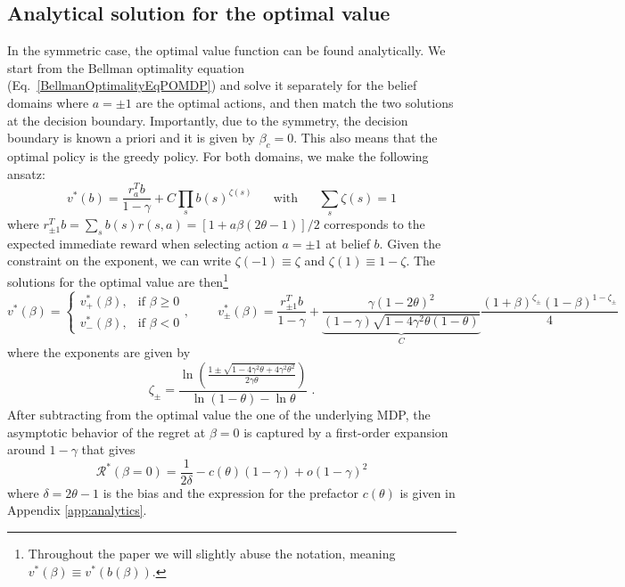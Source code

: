 \documentclass[aps,nofootinbib,groupaddress,superscriptaddress,reprint,amsmath,amssymb,graphicx,onecolumn,prx]{revtex4-2}
\begin{document}
\subsection{Analytical solution for the optimal value}
\noindent In the symmetric case, the optimal value function can be found analytically. We start from the Bellman optimality equation (Eq.~\eqref{BellmanOptimalityEqPOMDP}) and solve it separately for the belief domains where $a = \pm 1$ are the optimal actions, and then match the two solutions at the decision boundary. Importantly, due to the symmetry, the decision boundary is known a priori and it is given by $\beta_c=0$. This also means that the optimal policy is the greedy policy. For both domains, we make the following ansatz:
\begin{equation}
    v^*(b)=\frac{r_{a}^Tb}{1-\gamma}+C\prod_s b(s)^{\zeta(s)} \;\;\;\;\;\;\text{with}\;\;\;\;\;\; \sum_s\zeta(s)=1
    \label{eq:ansatz}
\end{equation}
where $r_{\pm1}^Tb=\sum_sb(s)r(s,a)=[1 + a \beta (2 \theta -1)] / 2$ corresponds to the expected immediate reward when selecting action $a=\pm1$ at belief $b$. Given the constraint on the exponent, we can write $\zeta(-1)\equiv\zeta$ and $\zeta(1)\equiv1-\zeta$.
The solutions for the optimal value are then\footnote{Throughout the paper we will slightly abuse the notation, meaning $v^*(\beta)\equiv v^*(b(\beta))$.}
\begin{equation}
    v^*(\beta)=
    \begin{cases}
        v^*_+(\beta), & \text{if } \beta \geq 0 \\
        v^*_-(\beta), & \text{if } \beta < 0
    \end{cases}, \; \; \; \; \; \; \; \;
    v^*_\pm(\beta)=\frac{r_{\pm1}^Tb}{1-\gamma}+\underbrace{\frac{\gamma (1 - 2\theta)^2}{(1 - \gamma) \sqrt{1 - 4\gamma^2\theta(1 - \theta)}}}_{C} \frac{(1+\beta)^{\zeta_\pm} (1-\beta)^{1 - \zeta_\pm}}{4}
\end{equation}
where the exponents are given by %
\begin{equation}
    \zeta_{\pm}=\frac{\ln \left( \frac{1 \pm \sqrt{1 - 4\gamma^2\theta + 4\gamma^2\theta^2}}{2\gamma\theta} \right)}
    {\ln(1 - \theta) - \ln\theta} \; .
    \label{eq:exponent}
\end{equation}
After subtracting from the optimal value the one of the underlying MDP, the asymptotic behavior of the regret at $\beta = 0$ is captured by a first-order expansion around $1 - \gamma$ that gives
\begin{equation}
    \mathcal{R^*}(\beta=0)=\frac{1}{2\delta}-c(\theta)(1-\gamma)+o(1-\gamma)^2
    \label{eq: asymptotic_symmetric_regret}
\end{equation}
where $\delta=2\theta-1$ is the bias and the expression for the prefactor $c(\theta)$ is given in Appendix \ref{app:analytics}.
\end{document}
